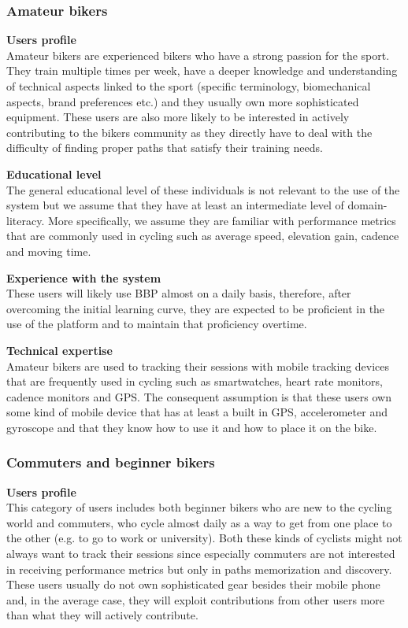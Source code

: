 \documentclass{article}
\begin{document}
\subsubsection{Amateur bikers}
\textbf{Users profile}\\
Amateur bikers are experienced bikers who have a strong passion for the sport. They train multiple times per week, have a deeper knowledge and understanding of technical aspects linked to the sport (specific terminology, biomechanical aspects, brand preferences etc.) and they usually own more sophisticated equipment. These users are also more likely to be interested in actively contributing to the bikers community as they directly have to deal with the difficulty of finding proper paths that satisfy their training needs. 

\vspace{0.5cm}
\noindent
\textbf{Educational level}\\
The general educational level of these individuals is not relevant to the use of the system but we assume that they have at least an intermediate level of domain-literacy. More specifically, we assume they are familiar with performance metrics that are commonly used in cycling such as average speed, elevation gain, cadence and moving time.

\vspace{0.5cm}
\noindent
\textbf{Experience with the system}\\
These users will likely use BBP almost on a daily basis, therefore, after overcoming the initial learning curve, they are expected to be proficient in the use of the platform and to maintain that proficiency overtime. 

\vspace{0.5cm}
\noindent
\textbf{Technical expertise}\\
Amateur bikers are used to tracking their sessions with mobile tracking devices that are frequently used in cycling such as smartwatches, heart rate monitors, cadence monitors and GPS. The consequent assumption is that these users own some kind of mobile device that has at least a built in GPS, accelerometer and gyroscope and that they know how to use it and how to place it on the bike.


\subsubsection{Commuters and beginner bikers}
\textbf{Users profile}\\
This category of users includes both beginner bikers who are new to the cycling world and commuters, who cycle almost daily as a way to get from one place to the other (e.g. to go to work or university). Both these kinds of cyclists might not always want to track their sessions since especially commuters are not interested in receiving performance metrics but only in paths memorization and discovery. These users usually do not own sophisticated gear besides their mobile phone and, in the average case, they will exploit contributions from other users more than what they will actively contribute.
\end{document}
